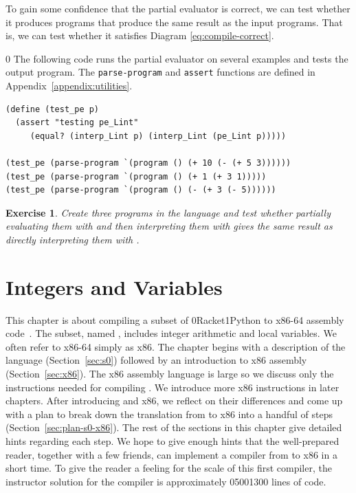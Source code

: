 \documentclass[7x10,nocrop]{TimesAPriori_MIT}%
\def\racketEd{0}
\def\pythonEd{1}
\def\edition{0}
\newcommand{\racket}[1]{{\if\edition\racketEd{#1}\fi}}
\newcommand{\python}[1]{{\if\edition\pythonEd #1\fi}}
\newtheorem{exercise}[theorem]{Exercise}
\begin{document}
To gain some confidence that the partial evaluator is correct, we can
test whether it produces programs that produce the same result as the
input programs. That is, we can test whether it satisfies Diagram
\ref{eq:compile-correct}.
%
{\if\edition\racketEd
The following code runs the partial evaluator on several examples and
tests the output program.  The \texttt{parse-program} and
\texttt{assert} functions are defined in
Appendix~\ref{appendix:utilities}.\\
\begin{minipage}{1.0\textwidth}
\begin{lstlisting}
(define (test_pe p)
  (assert "testing pe_Lint"
     (equal? (interp_Lint p) (interp_Lint (pe_Lint p)))))

(test_pe (parse-program `(program () (+ 10 (- (+ 5 3))))))
(test_pe (parse-program `(program () (+ 1 (+ 3 1)))))
(test_pe (parse-program `(program () (- (+ 3 (- 5))))))
\end{lstlisting}
\end{minipage}
\fi}

\begin{exercise}\normalfont\normalsize
  Create three programs in the \LangInt{} language and test whether
  partially evaluating them with  and then
  interpreting them with  gives the same result
  as directly interpreting them with .
\end{exercise}


\chapter{Integers and Variables}
\label{ch:Lvar}

This chapter is about compiling a subset of
\racket{Racket}\python{Python} to x86-64 assembly
code~\citep{Intel:2015aa}. The subset, named \LangVar{}, includes
integer arithmetic and local variables.  We often refer to x86-64
simply as x86.  The chapter begins with a description of the
\LangVar{} language (Section~\ref{sec:s0}) followed by an introduction
to x86 assembly (Section~\ref{sec:x86}). The x86 assembly language is
large so we discuss only the instructions needed for compiling
\LangVar{}. We introduce more x86 instructions in later chapters.
After introducing \LangVar{} and x86, we reflect on their differences
and come up with a plan to break down the translation from \LangVar{}
to x86 into a handful of steps (Section~\ref{sec:plan-s0-x86}).  The
rest of the sections in this chapter give detailed hints regarding
each step.  We hope to give enough hints that the well-prepared
reader, together with a few friends, can implement a compiler from
\LangVar{} to x86 in a short time.  To give the reader a feeling for
the scale of this first compiler, the instructor solution for the
\LangVar{} compiler is approximately \racket{500}\python{300} lines of
code.
\end{document}
